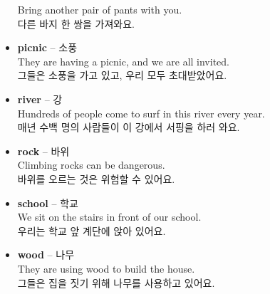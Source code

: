 \documentclass[12pt]{article}
\begin{document}
\begin{itemize}
    Bring another pair of pants with you. \\
    다른 바지 한 쌍을 가져와요.
    \item \textbf{picnic} -- 소풍 \\
    They are having a picnic, and we are all invited. \\
    그들은 소풍을 가고 있고, 우리 모두 초대받았어요.
    \item \textbf{river} -- 강 \\
    Hundreds of people come to surf in this river every year. \\
    매년 수백 명의 사람들이 이 강에서 서핑을 하러 와요.
    \item \textbf{rock} -- 바위 \\
    Climbing rocks can be dangerous. \\
    바위를 오르는 것은 위험할 수 있어요.
    \item \textbf{school} -- 학교 \\
    We sit on the stairs in front of our school. \\
    우리는 학교 앞 계단에 앉아 있어요.
    \item \textbf{wood} -- 나무 \\
    They are using wood to build the house. \\
    그들은 집을 짓기 위해 나무를 사용하고 있어요.
\end{itemize}
\end{document}
